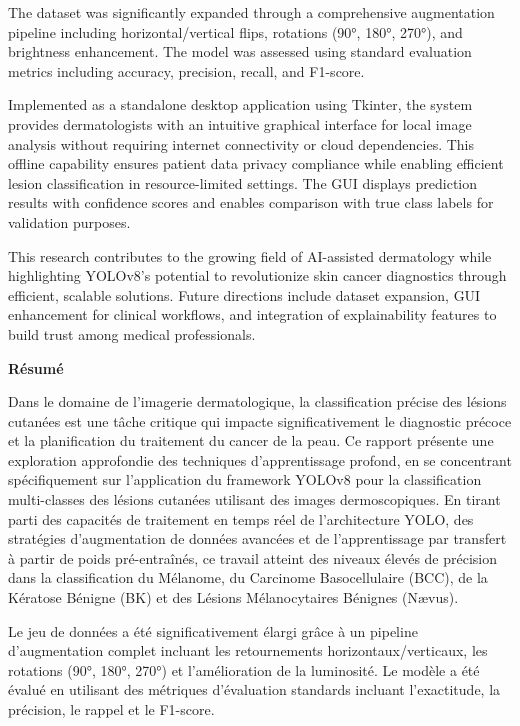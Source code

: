 \documentclass[a4paper,12pt]{report}
\begin{document}
\begin{spacing}{1.5}
    The dataset was significantly expanded through a comprehensive augmentation pipeline including horizontal/vertical flips, rotations (90°, 180°, 270°), and brightness enhancement. The model was assessed using standard evaluation metrics including accuracy, precision, recall, and F1-score. 
    
    Implemented as a standalone desktop application using Tkinter, the system provides dermatologists with an intuitive graphical interface for local image analysis without requiring internet connectivity or cloud dependencies. This offline capability ensures patient data privacy compliance while enabling efficient lesion classification in resource-limited settings. The GUI displays prediction results with confidence scores and enables comparison with true class labels for validation purposes.
    
    This research contributes to the growing field of AI-assisted dermatology while highlighting YOLOv8's potential to revolutionize skin cancer diagnostics through efficient, scalable solutions. Future directions include dataset expansion, GUI enhancement for clinical workflows, and integration of explainability features to build trust among medical professionals.
    
    \newpage
    \begin{center}
    \textbf{\huge Résumé}
    \end{center}
    
    Dans le domaine de l'imagerie dermatologique, la classification précise des lésions cutanées est une tâche critique qui impacte significativement le diagnostic précoce et la planification du traitement du cancer de la peau. Ce rapport présente une exploration approfondie des techniques d'apprentissage profond, en se concentrant spécifiquement sur l'application du framework YOLOv8 pour la classification multi-classes des lésions cutanées utilisant des images dermoscopiques. En tirant parti des capacités de traitement en temps réel de l'architecture YOLO, des stratégies d'augmentation de données avancées et de l'apprentissage par transfert à partir de poids pré-entraînés, ce travail atteint des niveaux élevés de précision dans la classification du Mélanome, du Carcinome Basocellulaire (BCC), de la Kératose Bénigne (BK) et des Lésions Mélanocytaires Bénignes (Nævus).

    Le jeu de données a été significativement élargi grâce à un pipeline d'augmentation complet incluant les retournements horizontaux/verticaux, les rotations (90°, 180°, 270°) et l'amélioration de la luminosité. Le modèle a été évalué en utilisant des métriques d'évaluation standards incluant l'exactitude, la précision, le rappel et le F1-score.
    

\end{spacing}
\end{document}
